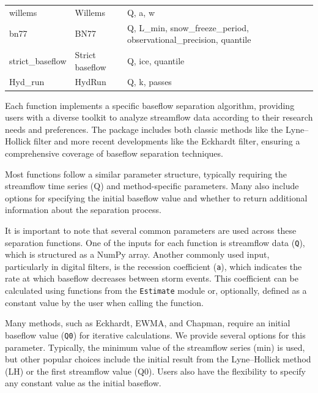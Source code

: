 \documentclass[hydrology,article,submit,pdftex,moreauthors]{Definitions/mdpi}
\begin{document}
\begin{table}[H]
\begin{tabularx}{\textwidth}{llXl}
willems         & Willems                                       & Q, a, w                                              & \cite{ref19} \\
bn77            & BN77                                          & Q, L\_min, snow\_freeze\_period, observational\_precision, quantile & \cite{ref20} \\
strict\_baseflow & Strict baseflow                              & Q, ice, quantile                                     & \cite{ref21} \\
Hyd\_run        & HydRun                                        & Q, k, passes                                         & \cite{ref22} \\
\bottomrule
\end{tabularx}
\end{table}

Each function implements a specific baseflow separation algorithm, providing users with a diverse toolkit to analyze streamflow data according to their research needs and preferences. The package includes both classic methods like the Lyne--Hollick filter and more recent developments like the Eckhardt filter, ensuring a comprehensive coverage of baseflow separation techniques.

Most functions follow a similar parameter structure, typically requiring the streamflow time series (Q) and method-specific parameters. Many also include options for specifying the initial baseflow value and whether to return additional information about the separation process.

It is important to note that several common parameters are used across these separation functions. One of the inputs for each function is streamflow data (\texttt{Q}), which is structured as a NumPy array. Another commonly used input, particularly in digital filters, is the recession coefficient (\texttt{a}), which indicates the rate at which baseflow decreases between storm events. This coefficient can be calculated using functions from the \texttt{Estimate} module or, optionally, defined as a constant value by the user when calling the function.

Many methods, such as Eckhardt, EWMA, and Chapman, require an initial baseflow value (\texttt{Q0}) for iterative calculations. We provide several options for this parameter. Typically, the minimum value of the streamflow series (min) is used, but other popular choices include the initial result from the Lyne--Hollick method (LH) or the first streamflow value (Q0). Users also have the flexibility to specify any constant value as the initial baseflow.
\end{document}
